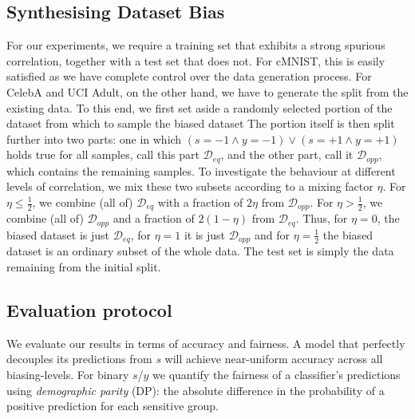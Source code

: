 \subsection{Synthesising Dataset Bias}
For our experiments, we require a training set that exhibits a strong spurious correlation, together with a test set that does not.
For cMNIST, this is easily satisfied as we have complete control over the data generation process.
For CelebA and  UCI Adult, on the other hand,
we have to generate the split from the existing data.
To this end, we first set aside a randomly selected portion of the dataset from which to sample the biased dataset
The portion itself is then split further into two parts:
one in which $(s=-1 \land y=-1) \lor (s=+1 \land y=+1)$ holds true for all samples, call this part $\mathcal{D}_{eq}$,
and the other part, call it $\mathcal{D}_{opp}$, which contains the remaining samples.
To investigate the behaviour at different levels of correlation,
we mix these two subsets according to a mixing factor $\eta$.
For $\eta \leq \tfrac{1}{2}$, we combine (all of) $\mathcal{D}_{eq}$
with a fraction of $2\eta$ from $\mathcal{D}_{opp}$.
For $\eta > \tfrac{1}{2}$, we combine (all of) $\mathcal{D}_{opp}$
and a fraction of $2(1 -\eta)$ from $\mathcal{D}_{eq}$.
Thus, for $\eta=0$, the biased dataset is just $\mathcal{D}_{eq}$,
for $\eta=1$ it is just $\mathcal{D}_{opp}$
and for $\eta=\tfrac{1}{2}$ the biased dataset is an ordinary subset of the whole data. The test set is simply the data remaining from the initial split.

\subsection{Evaluation protocol}
We evaluate our results in terms of accuracy and fairness.
A model that perfectly decouples its predictions from $s$ will achieve near-uniform accuracy across all biasing-levels.
For binary $s$/$y$ we quantify the fairness of a classifier's predictions using \emph{demographic parity} (DP): the  absolute difference in the probability  of a positive prediction for each sensitive group.


